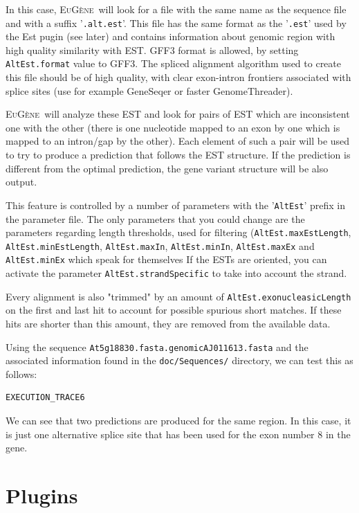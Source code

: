 \documentclass[a4paper,titlepage]{report}
\newcommand{\EuGene}{\textsc{EuG\`ene}}
\begin{document}
In this case, \EuGene\ will look for a file with the same name as the sequence
file and with a suffix '\texttt{.alt.est}'. This file has the same format as
the '\texttt{.est}' used by the Est pugin (see later) and contains information
about genomic region with high quality similarity with EST. GFF3 format is 
allowed, by setting \texttt{AltEst.format} value to GFF3. The spliced 
alignment algorithm used to create this file should be of high quality, 
with clear exon-intron frontiers associated with splice sites (use for example
GeneSeqer or faster GenomeThreader).

\EuGene\ will analyze these EST and look for pairs of EST which are inconsistent
one with the other (there is one nucleotide mapped to an exon by one which is 
mapped to an intron/gap by the other). Each element of such a pair will be used 
to try to produce a prediction that follows the EST structure. If the prediction
is different from the optimal prediction, the gene variant structure will be
also output.

This feature is controlled by a number of parameters with the '\texttt{AltEst}'
prefix in the parameter file. The only parameters that you could change are the
parameters regarding length thresholds, used for filtering (\texttt{AltEst.maxEstLength}, 
\texttt{AltEst.minEstLength}, \texttt{AltEst.maxIn}, \texttt{AltEst.minIn}, 
\texttt{AltEst.maxEx} and \texttt{AltEst.minEx} which speak for themselves
If the ESTs are oriented, you can activate the parameter \texttt{AltEst.strandSpecific} to take into account the strand.

Every alignment is also "trimmed" by an amount of \texttt{AltEst.exonucleasicLength} 
on the first and last hit to account for possible spurious short matches. 
If these hits are shorter than this amount, they are removed from the available data.

Using the sequence \texttt{At5g18830.fasta.genomicAJ011613.fasta} and
the associated information found in the \texttt{doc/Sequences/}
directory, we can test this as follows:

\begin{Verbatim}[fontsize=\scriptsize]
EXECUTION_TRACE6
\end{Verbatim}

We can see that two predictions are produced for the same region. In
this case, it is just one alternative splice site that has been used
for the exon number 8 in the gene.

\section{Plugins}
\label{plug}
\end{document}
